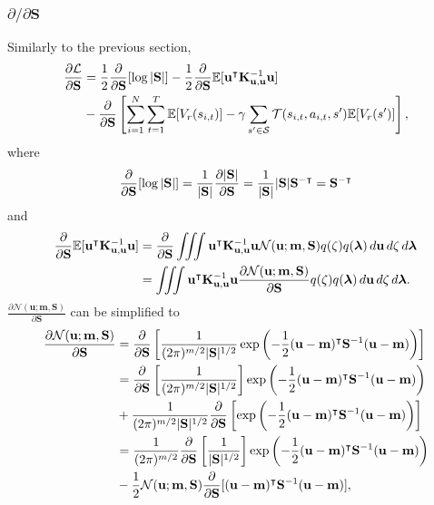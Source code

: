 \documentclass{mprop}
\theoremstyle{definition}
\begin{document}
\subsubsection{$\partial/\partial\mathbf{S}$}

Similarly to the previous section,
\[
  \begin{split}
    \frac{\partial\mathcal{L}}{\partial\mathbf{S}} &=
    \frac{1}{2}\frac{\partial}{\partial\mathbf{S}}[\log|\mathbf{S}|]
    -\frac{1}{2}\frac{\partial}{\partial\mathbf{S}}\mathbb{E}[\mathbf{u}^\intercal\mathbf{K}_{\mathbf{u},\mathbf{u}}^{-1}\mathbf{u}] \\
    &- \frac{\partial}{\partial\mathbf{S}} \left[\sum_{i=1}^N \sum_{t=1}^T \mathbb{E}[V_r(s_{i,t})] -
      \gamma\sum_{s' \in \mathcal{S}} \mathcal{T}(s_{i,t}, a_{i,t},
      s')\mathbb{E}[V_r(s')] \right],
  \end{split}
\]
where %
\[ \frac{\partial}{\partial\mathbf{S}}[\log|\mathbf{S}|] =
  \frac{1}{|\mathbf{S}|}\frac{\partial|\mathbf{S}|}{\partial \mathbf{S}} =
  \frac{1}{|\mathbf{S}|}|\mathbf{S}|\mathbf{S}^{-\intercal} =
  \mathbf{S}^{-\intercal} \]
and
\[
  \begin{split}
    \frac{\partial}{\partial\mathbf{S}}\mathbb{E}[\mathbf{u}^\intercal\mathbf{K}_{\mathbf{u},\mathbf{u}}^{-1}\mathbf{u}] &=
    \frac{\partial}{\partial\mathbf{S}}\iiint\mathbf{u}^\intercal\mathbf{K}_{\mathbf{u},\mathbf{u}}^{-1}\mathbf{u}\mathcal{N}(\mathbf{u};
    \mathbf{m},
    \mathbf{S})q(\zeta)q(\bm\lambda)\,d\mathbf{u}\,d\zeta\,d\bm\lambda \\
    &=
    \iiint\mathbf{u}^\intercal\mathbf{K}_{\mathbf{u},\mathbf{u}}^{-1}\mathbf{u}\frac{\partial \mathcal{N}(\mathbf{u};
      \mathbf{m}, \mathbf{S})}{\partial \mathbf{S}}q(\zeta)q(\bm\lambda)\,d\mathbf{u}\,d\zeta\,d\bm\lambda.
  \end{split}
\]
$\frac{\partial \mathcal{N}(\mathbf{u}; \mathbf{m}, \mathbf{S})}{\partial \mathbf{S}}$ can be simplified to
\[
  \begin{split}
    \frac{\partial \mathcal{N}(\mathbf{u}; \mathbf{m}, \mathbf{S})}{\partial \mathbf{S}} &=
    \frac{\partial}{\partial\mathbf{S}}\left[\frac{1}{(2\pi)^{m/2}|\mathbf{S}|^{1/2}}\exp \left( -\frac{1}{2}
        (\mathbf{u} - \mathbf{m})^\intercal\mathbf{S}^{-1}(\mathbf{u} -
        \mathbf{m})\right)\right] \\
    &= \frac{\partial}{\partial\mathbf{S}}\left[\frac{1}{(2\pi)^{m/2}|\mathbf{S}|^{1/2}}\right]\exp \left( -\frac{1}{2}
        (\mathbf{u} - \mathbf{m})^\intercal\mathbf{S}^{-1}(\mathbf{u} -
        \mathbf{m})\right) \\
      &+ \frac{1}{(2\pi)^{m/2}|\mathbf{S}|^{1/2}}\frac{\partial}{\partial\mathbf{S}}\left[\exp\left( -\frac{1}{2}
        (\mathbf{u} - \mathbf{m})^\intercal\mathbf{S}^{-1}(\mathbf{u} -
        \mathbf{m})\right)\right] \\
    &=
    \frac{1}{(2\pi)^{m/2}}\frac{\partial}{\partial\mathbf{S}}\left[\frac{1}{|\mathbf{S}|^{1/2}}\right]\exp
    \left( -\frac{1}{2} (\mathbf{u} -
      \mathbf{m})^\intercal\mathbf{S}^{-1}(\mathbf{u} - \mathbf{m})\right) \\
    &- \frac{1}{2}\mathcal{N}(\mathbf{u}; \mathbf{m}, \mathbf{S})\frac{\partial}{\partial\mathbf{S}}[(\mathbf{u}
    - \mathbf{m})^\intercal\mathbf{S}^{-1}(\mathbf{u} - \mathbf{m})], \\
  \end{split}
\]
\end{document}

